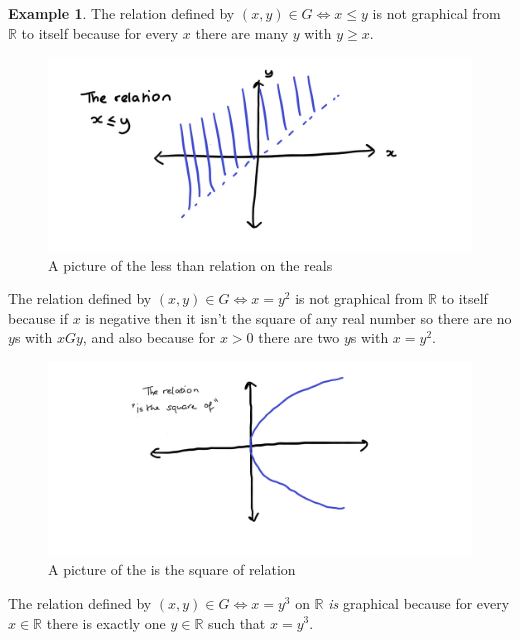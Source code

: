 \documentclass[
]{book}
\theoremstyle{definition}
\theoremstyle{definition}
\newtheorem{example}{Example}[chapter]
\theoremstyle{definition}
\theoremstyle{definition}
\theoremstyle{remark}
\begin{document}
\begin{example}

The relation defined by \((x,y) \in G \Leftrightarrow x \leq y\) is not graphical from \(\mathbb{R}\) to itself because for every \(x\) there are many \(y\) with \(y \geq x\).

\begin{figure}
\centering
\includegraphics{less than.png}
\caption{\label{fig:unnamed-chunk-6}A picture of the less than relation on the reals}
\end{figure}

The relation defined by \((x,y) \in G \Leftrightarrow x=y^2\) is not graphical from \(\mathbb{R}\) to itself because if \(x\) is negative then it isn't the square of any real number so there are no \(y\)s with \(x G y\), and also because for \(x > 0\) there are two \(y\)s with \(x=y^2\).

\begin{figure}
\centering
\includegraphics{is the square of.png}
\caption{\label{fig:unnamed-chunk-7}A picture of the is the square of relation}
\end{figure}

The relation defined by \((x,y) \in G \Leftrightarrow x=y^3\) on \(\mathbb{R}\) \emph{is} graphical because for every \(x \in \mathbb{R}\) there is exactly one \(y \in \mathbb{R}\) such that \(x=y^3\).


\end{example}
\end{document}
